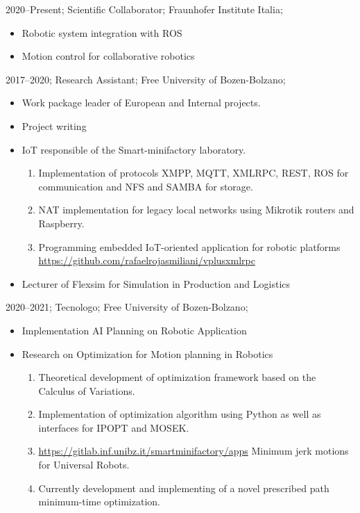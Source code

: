 \addwork%
{%
    2020--Present;%
    Scientific Collaborator;%
    Fraunhofer Institute Italia;%
    \begin{itemize}
        \item Robotic system integration with ROS
        \item Motion control for collaborative robotics
    \end{itemize}
}%
\addwork%
{%
    2017--2020;%
    Research Assistant;%
    Free University of Bozen-Bolzano;%
    \begin{itemize}
        \item Work package leader of European and Internal projects.
        \item Project writing
        \item IoT responsible of the Smart-minifactory laboratory.
            \ifdefined\extended
                \begin{enumerate}
                    \item Implementation of protocols XMPP, MQTT, XMLRPC, REST, ROS for communication and NFS and SAMBA for storage.
                    \item NAT implementation for legacy local networks using Mikrotik routers and Raspberry.
                    \item Programming embedded IoT-oriented application for robotic platforms \href{https://github.com/rafaelrojasmiliani/vplusxmlrpc}{https://github.com/rafaelrojasmiliani/vplusxmlrpc}
                \end{enumerate}
            \fi
        \item Lecturer of Flexsim for Simulation in Production and Logistics             
    \end{itemize}
}%
\addwork%
{%
    2020--2021;%
    Tecnologo;%
    Free University of Bozen-Bolzano;%
    \begin{itemize}
        \item Implementation AI Planning on Robotic Application
        \item Research on Optimization for Motion planning in Robotics
            \ifdefined\extended
                \begin{enumerate}
                    \item Theoretical development of optimization framework based on the Calculus of Variations.
                    \item Implementation of optimization algorithm using Python as well as interfaces for IPOPT and MOSEK.
                    \item \href{https://gitlab.inf.unibz.it/smartminifactory/apps}{https://gitlab.inf.unibz.it/smartminifactory/apps} Minimum jerk motions for Universal Robots.
                    \item Currently development and implementing of a novel prescribed path minimum-time optimization.
                \end{enumerate}
            \fi
    \end{itemize}
}%
